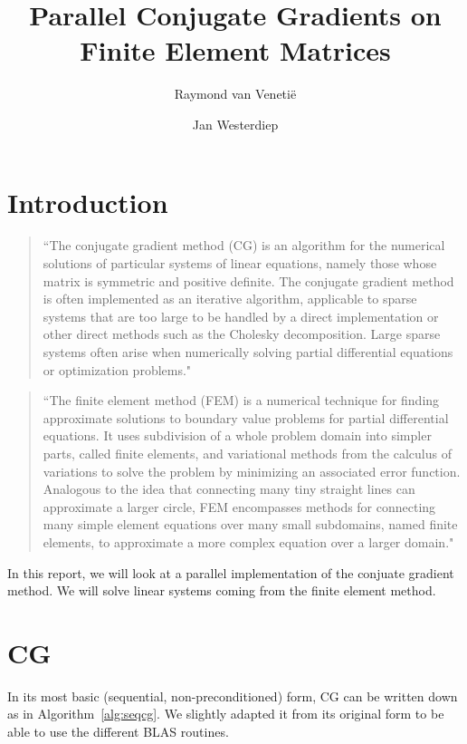 \documentclass[11pt]{amsart}
\theoremstyle{definition}
\begin{document}
\title{Parallel Conjugate Gradients on Finite Element Matrices}
\author{Raymond van Veneti\"e \and Jan Westerdiep}
\maketitle

\section{Introduction}
\begin{quote}
``The conjugate gradient method (CG) is an algorithm for the numerical solutions of particular systems of linear equations, namely those whose matrix is symmetric and positive definite. The conjugate gradient method is often implemented as an iterative algorithm, applicable to sparse systems that are too large to be handled by a direct implementation or other direct methods such as the Cholesky decomposition. Large sparse systems often arise when numerically solving partial differential equations or optimization problems." \cite{wiki:cg}
\end{quote}

\begin{quote}
``The finite element method (FEM) is a numerical technique for finding approximate solutions to boundary value problems for partial differential equations. It uses subdivision of a whole problem domain into simpler parts, called finite elements, and variational methods from the calculus of variations to solve the problem by minimizing an associated error function. Analogous to the idea that connecting many tiny straight lines can approximate a larger circle, FEM encompasses methods for connecting many simple element equations over many small subdomains, named finite elements, to approximate a more complex equation over a larger domain." \cite{wiki:fem}
\end{quote}

In this report, we will look at a parallel implementation of the conjuate gradient method. We will solve linear systems coming from the finite element method.

\section{CG}
In its most basic (sequential, non-preconditioned) form, CG can be written down as in Algorithm~\ref{alg:seqcg}. \cite[Alg.~4.8]{biss04} We slightly adapted it from its original form to be able to use the different BLAS routines.
\end{document}
